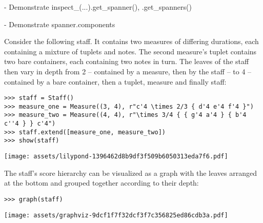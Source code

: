 -   Demonstrate inspect\_(...).get\_spanner(), .get\_spanners()

-   Demonstrate spanner.components

Consider the following staff. It contains two measures of differing durations,
each containing a mixture of tuplets and notes. The second measure's tuplet
contains two bare containers, each containing two notes in turn. The leaves of
the staff then vary in depth from 2 -- contained by a measure, then by the
staff -- to 4 -- contained by a bare container, then a tuplet, measure and
finally staff:

\begin{comment}
<abjad>
staff = Staff()
measure_one = Measure((3, 4), r"c'4 \times 2/3 { d'4 e'4 f'4 }")
measure_two = Measure((4, 4), r"\times 3/4 { { g'4 a'4 } { b'4 c''4 } } c'4")
staff.extend([measure_one, measure_two])
show(staff)
</abjad>
\end{comment}

\begin{abjadbookoutput}
\begin{singlespacing}
\vspace{-0.5\baselineskip}
\begin{lstlisting}
>>> staff = Staff()
>>> measure_one = Measure((3, 4), r"c'4 \times 2/3 { d'4 e'4 f'4 }")
>>> measure_two = Measure((4, 4), r"\times 3/4 { { g'4 a'4 } { b'4 c''4 } } c'4")
>>> staff.extend([measure_one, measure_two])
>>> show(staff)
\end{lstlisting}
\noindent\texttt{[image: assets/lilypond-1396462d8b9df3f509b6050313eda7f6.pdf]}
\end{singlespacing}
\end{abjadbookoutput}

The staff's score hierarchy can be visualized as a graph with the leaves
arranged at the bottom and grouped together according to their depth:

\begin{comment}
<abjad>
graph(staff)
</abjad>
\end{comment}

\begin{abjadbookoutput}
\begin{singlespacing}
\vspace{-0.5\baselineskip}
\begin{lstlisting}
>>> graph(staff)
\end{lstlisting}
\noindent\texttt{[image: assets/graphviz-9dcf1f7f32dcf3f7c356825ed86cdb3a.pdf]}
\end{singlespacing}
\end{abjadbookoutput}

